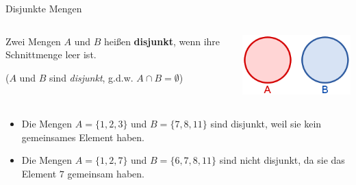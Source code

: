 \documentclass[12pt,ngerman,a4paper,ignorenonframetext,]{beamer}
\providecommand{\tightlist}{%
  \setlength{\itemsep}{0pt}\setlength{\parskip}{0pt}}
\begin{document}
\begin{frame}{Disjunkte Mengen}
\protect\hypertarget{disjunkte-mengen}{}

\begin{columns}[T]
\begin{column}{0.66\textwidth}

\begin{definition}

Zwei Mengen \(A\) und \(B\) heißen \textbf{disjunkt}, wenn ihre
Schnittmenge leer ist.

(\(A\) und \(B\) sind \emph{disjunkt},
\mbox{g.\thinspace{}d.\thinspace{}w.}\xspace{} \(A \cap B = \emptyset\))

\end{definition}
\end{column}

\begin{column}{0.33\textwidth}
\begin{center}\includegraphics[width=0.8\linewidth]{./images/MGWI/220px-Disjunkte_Mengen} \end{center}
\end{column}
\end{columns}


\begin{Beispiele}[]

\begin{itemize}
\tightlist
\item
  Die Mengen \(A = \{1, 2, 3\}\) und \(B = \{7, 8, 11\}\) sind disjunkt,
  weil sie kein gemeinsames Element haben.
\item
  Die Mengen \(A = \{1, 2, 7\}\) und \(B = \{6, 7, 8, 11\}\) sind nicht
  disjunkt, da sie das Element \(7\) gemeinsam haben.
\end{itemize}

\end{Beispiele}

\end{frame}
\end{document}
